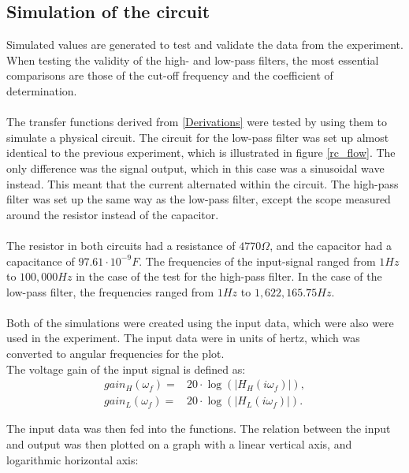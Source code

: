 \subsection{Simulation of the circuit}
Simulated values are generated to test and validate the data from the experiment. When testing the validity of the high- and low-pass filters, the most essential comparisons are those of the cut-off frequency and the coefficient of determination. 
\\ \\
The transfer functions derived from \cref{Derivations} were tested by using them to simulate a physical circuit. The circuit for the low-pass filter was set up almost identical to the previous experiment, which is illustrated in figure \ref{rc_flow}. The only difference was the signal output, which in this case was a sinusoidal wave instead. This meant that the current alternated within the circuit. The high-pass filter was set up the same way as the low-pass filter, except the scope measured around the resistor instead of the capacitor.
\\
\\
The resistor in both circuits had a resistance of $4770 \Omega$, and the capacitor had a capacitance of $97.61\cdot 10^{-9} F$. The frequencies of the input-signal ranged from $1 Hz$ to $100,000 Hz$ in the case of the test for the high-pass filter. In the case of the low-pass filter, the frequencies ranged from $1 Hz$ to $1,622,165.75 Hz$.
\\
\\
Both of the simulations were created using the input data, which were also were used in the experiment. The input data were in units of hertz, which was converted to angular frequencies for the plot.
\\
The voltage gain of the input signal is defined as:
\begin{align*}
	gain_H(\omega _f) =&20 \cdot \log{\left( \left|H_{H}(i \omega_f)\right| \right)},
	\\
	gain_L(\omega _f) =&20 \cdot \log{\left( \left|H_{L}(i \omega_f)\right| \right)}.
\end{align*}

\noindent The input data was then fed into the functions. The relation between the input and output was then plotted on a graph with a linear vertical axis, and logarithmic horizontal axis:


